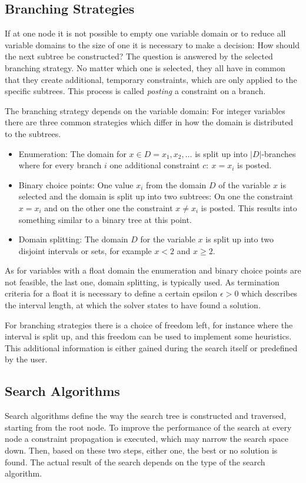 \documentclass[10pt,
               a4paper,
               journal,
               ]{IEEEtran}
\begin{document}
		\subsection{Branching Strategies}
	If at one node it is not possible to empty one variable domain or to reduce all variable domains to the size of one it is necessary to make a decision: How should the next subtree be constructed? The question is answered by the selected branching strategy. No matter which one is selected, they all have in common that they create additional, temporary constraints, which are only applied to the specific subtrees. This process is called \emph{posting} a constraint on a branch.
	
	The branching strategy depends on the variable domain: For integer variables there are three common strategies \cite[p.~87]{handbookCP} which differ in how the domain is distributed to the subtrees.
	\begin{itemize}
		\item Enumeration: The domain for $x \in D = {x_1, x_2, \dots}$ is split up into $|D|$-branches where for every branch $i$ one additional constraint $c:\ x = x_i$ is posted.
		\item Binary choice points: One value $x_i$ from the domain $D$ of the variable $x$ is selected and the domain is split up into two subtrees: On one the constraint $x = x_i$ and on the other one the constraint $x \ne x_i$ is posted. This results into something similar to a binary tree at this point.
		\item Domain splitting: The domain $D$ for the variable $x$ is split up into two disjoint intervals or sets, for example $x < 2$ and $x \ge 2$.
	\end{itemize}
	
	As for variables with a float domain the enumeration and binary choice points are not feasible, the last one, domain splitting, is typically used. As termination criteria for a float it is necessary to define a certain epsilon $\epsilon > 0$ which describes the interval length, at which the solver states to have found a solution.
	
	For branching strategies there is a choice of freedom left, for instance where the interval is split up, and this freedom can be used to implement some heuristics. This additional information is either gained during the search itself or predefined by the user.
	
	\subsection{Search Algorithms}
	Search algorithms define the way the search tree is constructed and traversed, starting from the root node. To improve the performance of the search at every node a constraint propagation is executed, which may narrow the search space down. Then, based on these two steps, either one, the best or no solution is found. The actual result of the search depends on the type of the search algorithm.
	
\end{document}
